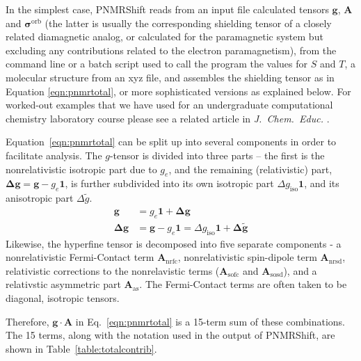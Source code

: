 \documentclass[11pt]{report}
\newcommand\PNMRShift{\textsf{PNMRShift}\xspace}
\newcommand{\mat}{\bm}    %
\newcommand{\ten}{\bm}
\newcommand\nrfc{\mathrm{nrfc}}
\newcommand\nrsd{\mathrm{nrsd}}
\newcommand\sofc{\mathrm{sofc}}
\newcommand\sosd{\mathrm{sosd}}
\newcommand\soas{\mathrm{as}}
\newcommand\iso{\mathrm{iso}}
\begin{document}
In the simplest case, \PNMRShift reads from an input file calculated
tensors $\ten{g}$, $\ten{A}$ and $\ten{\sigma}^{\mathrm{orb}}$ (the
latter is usually the corresponding shielding tensor of a closely
related diamagnetic analog, or calculated for the paramagnetic system
but excluding any contributions related to the electron
paramagnetism), from the command line or a batch script used to call
the program the values for $S$ and $T$, a molecular structure from an
xyz file, and assembles the shielding tensor as in Equation
\ref{eqn:pnmrtotal}, or more sophisticated versions as explained
below. For worked-out examples that we have used for an undergraduate
computational chemistry laboratory course please see a related article in
\textit{J.\ Chem.\ Educ.} \cite{Autschbach:2013h}. 

Equation~\ref{eqn:pnmrtotal} can be split up into several components
in order to facilitate analysis. The $g$-tensor is divided into three
parts -- the first is the nonrelativistic isotropic part due to $g_e$,
and the remaining (relativistic) part,
$\ten{\Delta g} = \ten{g} - g_e\mat{1}$, is further subdivided into
its own isotropic part $\Delta g_\iso \mat{1}$, and its anisotropic
part $\Delta \tilde{g}$.
%
\begin{align}
       \ten{g} &= g_e\mat{1} + \ten{\Delta g} \\
\ten{\Delta g} &= \ten{g} - g_e\mat{1} = \Delta g_\iso\mat{1} + \ten{\Delta \tilde{g}}
\end{align}
%
Likewise, the hyperfine tensor is decomposed into five separate components -
a nonrelativistic Fermi-Contact term $\ten{A}_\nrfc$, nonrelativistic spin-dipole term $\ten{A}_\nrsd$,
relativistic corrections to the nonrelavistic terms ($\ten{A}_\sofc$ and $\ten{A}_\sosd$),
and a relativstic asymmetric part $\ten{A}_\soas$. The Fermi-Contact terms are often taken to be
diagonal, isotropic tensors.

Therefore, $\ten{g} \cdot \ten{A}$ in Eq.~\ref{eqn:pnmrtotal} is
a 15-term sum of these combinations.\cite{Pennanen:2008a,Liimatainen:2009a} 
The 15 terms, along with the notation used in the output of \PNMRShift,
are shown in Table~\ref{table:totalcontrib}.
\end{document}
